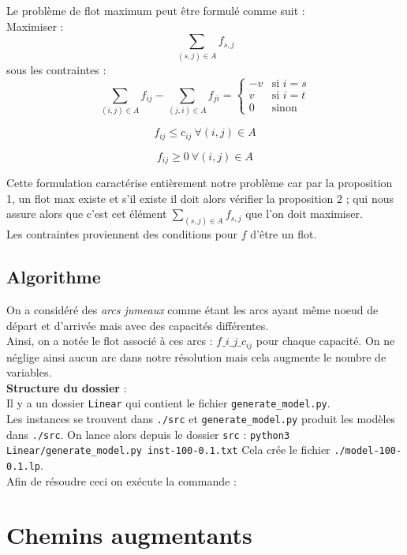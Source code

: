 \documentclass{article}[12pt]
\begin{document}
Le problème de flot maximum peut être formulé comme suit : \\
Maximiser :
$$\sum_{(s,j) \in A} f_{s,j}$$
sous les contraintes :
$$\sum_{(i,j) \in A} f_{ij} - \sum_{(j,i) \in A} f_{ji} =
\begin{cases}
-v & \text{si } i=s \\
v & \text{si } i=t \\
0 & \text{sinon}
\end{cases}$$

$$f_{ij} \leq c_{ij} ~ \forall (i,j) \in A$$

$$f_{ij} \geq 0 ~ \forall (i,j) \in A $$

Cette formulation caractérise entièrement notre problème car par la proposition 1, un flot max existe et s'il existe il doit alors vérifier la proposition 2 ; qui nous assure alors que c'est cet élément $\sum_{(s,j) \in A} f_{s,j}$ que l'on doit maximiser. \\
Les contraintes proviennent des conditions pour $f$ d'être un flot.\\

\subsection{Algorithme}

On a considéré des {\it arcs jumeaux} comme étant les arcs ayant même noeud de départ et d'arrivée mais avec des capacités différentes.\\
Ainsi, on a notée le flot associé à ces arcs : $f\_i\_j\_c_{ij}$ pour chaque capacité. On ne néglige ainsi aucun arc dans notre résolution mais cela augmente le nombre de variables.\\

{\bf Structure du dossier } : \\
Il y a un dossier \texttt{Linear} qui contient le fichier \texttt{generate\_model.py}. \\
Les instances se trouvent dans \texttt{./src} et \texttt{generate\_model.py} produit les modèles dans \texttt{./src}.
On lance alors depuis le dossier \texttt{src} : 
\texttt{python3 Linear/generate\_model.py inst-100-0.1.txt}
Cela crée le fichier \texttt{./model-100-0.1.lp}.\\
 Afin de résoudre ceci on exécute la commande : \\


\section{Chemins augmentants}
\end{document}
